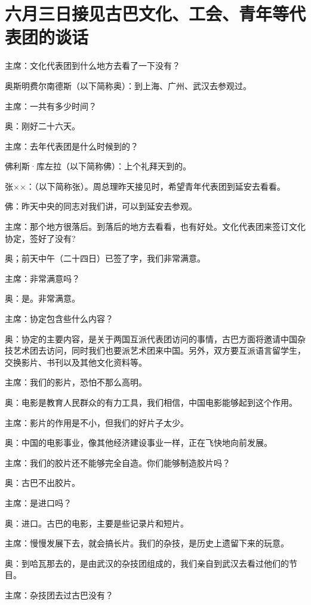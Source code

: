 \section[六月三日接见古巴文化、工会、青年等代表团的谈话（一九六三年七月二十六日）]{六月三日接见古巴文化、工会、青年等代表团的谈话}


主席：文化代表团到什么地方去看了一下没有？

奥斯明费尔南德斯（以下简称奥）：到上海、广州、武汉去参观过。

主席：一共有多少时间？

奥：刚好二十六天。

主席：去年代表团是什么时候到的？

佛利斯·库左拉（以下简称佛）：上个礼拜天到的。

张××：（以下简称张）。周总理昨天接见时，希望青年代表团到延安去看看。

佛：昨天中央的同志对我们讲，可以到延安去参观。

主席：那个地方很落后。到落后的地方去看看，也有好处。文化代表团来签订文化协定，签好了没有?

奥；前天中午（二十四日）已签了字，我们非常满意。

主席：非常满意吗？

奥：是。非常满意。

主席：协定包含些什么内容？

奥：协定的主要内容，是关于两国互派代表团访问的事情，古巴方面将邀请中国杂技艺术团去访问，同时我们也要派艺术团来中国。另外，双方要互派语言留学生，交换影片、书刊以及其他文化资料等。

主席：我们的影片，恐怕不那么高明。

奥：电影是教育人民群众的有力工具，我们相信，中国电影能够起到这个作用。

主席：影片的作用是不小，但我们的好片子太少。

奥：中国的电影事业，像其他经济建设事业一样，正在飞快地向前发展。

主席：我们的胶片还不能够完全自造。你们能够制造胶片吗？

奥：古巴不出胶片。

主席：是进口吗？

奥：进口。古巴的电影，主要是些记录片和短片。

主席：慢慢发展下去，就会搞长片。我们的杂技，是历史上遗留下来的玩意。

奥：到哈瓦那去的，是由武汉的杂技团组成的，我们亲自到武汉去看过他们的节目。

主席：杂技团去过古巴没有？

